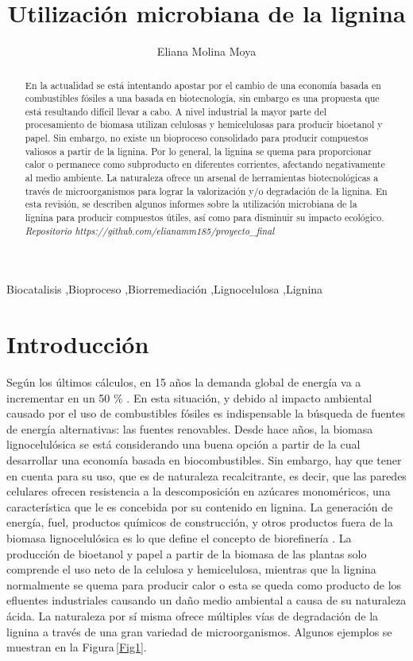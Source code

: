 \documentclass[final,a4paper,times,3p,onecolumn]{elsarticle}
\begin{document}
\begin{frontmatter}
\title{Utilización microbiana de la lignina}
\author[deg]{Eliana Molina Moya}
\address[deg]{Universidad de Granada}
\begin{abstract}
En la actualidad se está intentando apostar por el cambio de una economía basada en combustibles fósiles a una basada en biotecnología, sin embargo es una propuesta que está resultando difícil llevar a cabo. A nivel industrial la mayor parte del procesamiento de biomasa utilizan celulosas y hemicelulosas para producir bioetanol y papel. Sin embargo, no existe un bioproceso consolidado para producir compuestos valiosos a partir de la lignina. Por lo general, la lignina se quema para proporcionar calor o permanece como subproducto en diferentes corrientes, afectando negativamente al medio ambiente.  La naturaleza ofrece un arsenal de herramientas biotecnológicas a través de microorganismos para lograr la valorización y/o degradación de la lignina. En esta revisión, se describen algunos informes sobre la utilización microbiana de la lignina para producir compuestos útiles, así como para disminuir su impacto ecológico. \textit{Repositorio https://github.com/elianamm185/proyecto\_final}
\end{abstract}	

\begin{keyword}
Biocatalisis \sep Bioproceso \sep Biorremediación \sep Lignocelulosa \sep Lignina 
\end{keyword}

\end{frontmatter}

\section{Introducción}
Según los últimos cálculos, en 15 años la demanda global de energía va a incrementar en un 50 \% \cite{McCann2015}. En esta situación, y debido al impacto ambiental causado por el uso de combustibles fósiles es indispensable la búsqueda de fuentes de energía alternativas: las fuentes renovables. Desde hace años, la biomasa lignocelulósica se está considerando una buena opción a partir de la cual desarrollar una economía basada en biocombustibles. Sin embargo, hay que tener en cuenta para su uso, que es de naturaleza recalcitrante, es decir,  que las paredes celulares ofrecen resistencia a la descomposición en azúcares monoméricos, una característica que le es concebida por su contenido en lignina. La generación de energía, fuel, productos químicos de construcción, y otros productos fuera de la biomasa lignocelulósica es lo que define el concepto de biorefinería \cite{Maity2015}. La producción de bioetanol y papel a partir de la biomasa de las plantas solo comprende el uso neto de la celulosa y hemicelulosa, mientras que la lignina normalmente se quema para producir calor o esta se queda como producto de los efluentes industriales causando un daño medio ambiental a causa de su naturaleza ácida. La naturaleza por sí misma ofrece múltiples vías de degradación de la lignina a través de una gran variedad de microorganismos. Algunos ejemplos se muestran en la Figura\,\ref{Fig1}.
\end{document}
